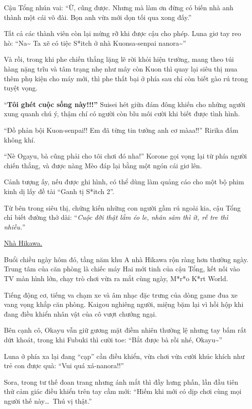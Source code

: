\documentclass[../main.tex]{subfiles}
\begin{document}
Cậu Tổng nhún vai: ``Ừ, cũng được. Nhưng mà làm ơn đừng có biến nhà anh thành một cái võ đài. Bọn anh vừa mới dọn tối qua xong đấy.''

Tất cả các thành viên còn lại mừng rỡ khi được cậu cho phép. Luna giơ tay reo hò: ``Na\~{} Ta xẽ có tiệc S*itch ở nhà Kuonsa-senpai nanora\~{}''

Và rồi, trong khi phe chiến thắng lặng lẽ rời khỏi hiện trường, mang theo túi hàng nặng trĩu và tâm trạng nhẹ như mây còn Kuon thì quay lại siêu thị mua thêm phụ kiện cho máy mới, thì phe thất bại ở phía sau chỉ còn biết gào rú trong tuyệt vọng.

``\textbf{Tôi ghét cuộc sống này!!!''} Suisei hét giữa đám đông khiến cho những người xung quanh chú ý, thậm chí có người còn bĩu môi cười khi biết được tình hình.

``Đồ phản bội Kuon-senpai!! Em đã từng tin tưởng anh cơ màaa!!'' Ririka đấm không khí.

``Nè Ogayu, bà cũng phải cho tôi chơi đó nha!'' Korone gọi vọng lại từ phía người chiến thắng, và được nàng Mèo đáp lại bằng một ngón cái giơ lên.

Cảnh tượng ấy, nếu được ghi hình, có thể dùng làm quảng cáo cho một bộ phim kinh dị lấy đề tài ``Ganh tị S*itch 2''.

Từ bên trong siêu thị, chứng kiến những con người gầm rú ngoài kia, cậu Tổng chỉ biết đường thở dài: ``\textit{Cuộc đời thật lắm éo le, nhân sâm thì ít, rễ tre thì nhiều.}''

\begin{center}
    \uline{Nhà Hikawa.}
\end{center}

Buổi chiều ngày hôm đó, tầng năm khu A nhà Hikawa rộn ràng hơn thường ngày. Trung tâm của căn phòng là chiếc máy Hai mới tinh của cậu Tổng, kết nối vào TV màn hình lớn, chạy trò chơi vừa ra mắt cùng ngày, M*r*o K*rt World.

Tiếng động cơ, tiếng va chạm xe và âm nhạc đặc trưng của dòng game đua xe vang vọng khắp căn phòng. Kaigou nghiêng người, miệng bặm lại vì hồi hộp khi đang điều khiển nhân vật của cô vượt chướng ngại.

Bên cạnh cô, Okayu vẫn giữ gương mặt điềm nhiên thường lệ nhưng tay bấm rất dứt khoát, trong khi Fubuki thì cười toe: ``Bắt được bà rồi nhé, Okayu\~{}''

Luna ở phía xa lại đang ``cạp'' cần điều khiển, vừa chơi vừa cười khúc khích như trẻ con được quà: ``Vui quá xá-nanora!!''

Sora, trong tư thế đoan trang nhưng ánh mắt thì đầy hưng phấn, lần đầu tiên thử cảm giác điều khiển trên tay cầm mới: ``Hiếm khi mới có dịp chơi cùng mọi người thế này\dots\ Thú vị thật.''
\end{document}
